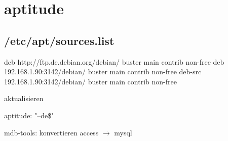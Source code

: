 \section{aptitude}


\subsection{/etc/apt/sources.list}

\begin{verbbox}
deb http://ftp.de.debian.org/debian/ buster main contrib non-free
deb 192.168.1.90:3142/debian/ buster main contrib non-free
deb-src 192.168.1.90:3142/debian/ buster main contrib non-free
\end{verbbox}
\fbox{\theverbbox}

aktualisieren

aptitude: "--de\$"

mdb-tools:           konvertieren access $\rightarrow$ mysql
 
